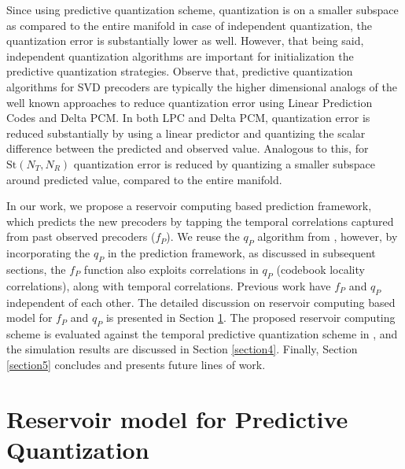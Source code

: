 \documentclass[conference]{IEEEtran}
\begin{document}
Since using predictive quantization scheme, quantization is on a smaller subspace as compared to the entire manifold in case of independent quantization, the quantization error is substantially lower as well.
However, that being said, independent quantization algorithms are important for initialization the predictive quantization strategies.
Observe that, predictive quantization algorithms for SVD precoders are typically the higher dimensional analogs of the well known approaches to reduce quantization error using Linear Prediction Codes and Delta PCM.  
In both LPC and Delta PCM, quantization error is reduced substantially by using a linear predictor and quantizing the scalar difference between the predicted and observed value. 
Analogous to this, for $\text{St}(N_T,N_R)$ quantization error is reduced by quantizing a smaller subspace around predicted value, compared to the entire manifold.

In our work, we propose a reservoir computing based prediction framework, which predicts the new precoders by tapping the temporal correlations captured from past observed precoders ($f_P$). 
We reuse the $q_P$ algorithm from \cite{Gupt1905:Predictive,6891198}, however, by incorporating the $q_P$ in the prediction framework, as discussed in subsequent sections, the $f_P$ function also exploits correlations in $q_P$ (codebook locality correlations), along with temporal correlations. 
Previous work \cite{Gupt1905:Predictive,6891198} have $f_P$ and $q_P$ independent of each other.
The detailed discussion on reservoir computing based model for $f_P$ and $q_P$ is presented in Section \ref{section3}. 
The proposed reservoir computing scheme is evaluated against the temporal predictive quantization scheme in \cite{6891198}, and the simulation results are discussed in Section \ref{section4}. Finally, Section \ref{section5} concludes and presents future lines of work. 

\section{Reservoir model for Predictive Quantization}
\label{section3}
\end{document}
